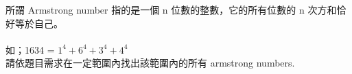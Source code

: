 所謂 Armstrong number 指的是一個 n 位數的整數，它的所有位數的 n 次方和恰好等於自己。\\
\\
如；1634 = $1^4 + 6^4 + 3^4+ 4^4$\\
請依題目需求在一定範圍內找出該範圍內的所有 armstrong numbers.